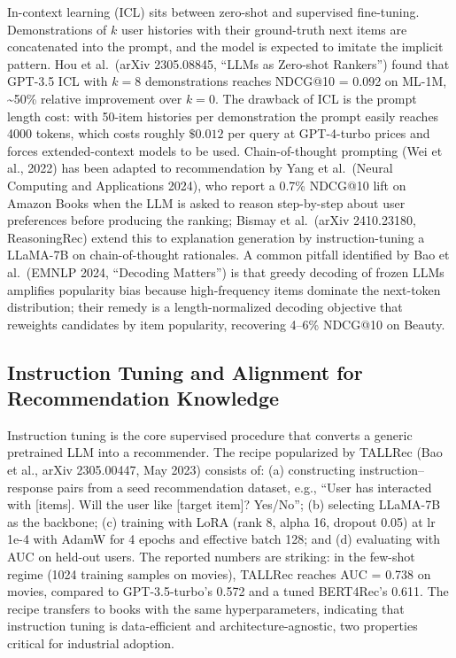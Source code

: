In-context learning (ICL) sits between zero-shot and supervised fine-tuning. Demonstrations of \(k\) user histories with their ground-truth next items are concatenated into the prompt, and the model is expected to imitate the implicit pattern. Hou et al.~(arXiv 2305.08845, ``LLMs as Zero-shot Rankers'') found that GPT-3.5 ICL with \(k=8\) demonstrations reaches NDCG@10 = 0.092 on ML-1M, \textasciitilde50\% relative improvement over \(k=0\). The drawback of ICL is the prompt length cost: with 50-item histories per demonstration the prompt easily reaches 4000 tokens, which costs roughly \(\$0.012\) per query at GPT-4-turbo prices and forces extended-context models to be used. Chain-of-thought prompting (Wei et al., 2022) has been adapted to recommendation by Yang et al.~(Neural Computing and Applications 2024), who report a 0.7\% NDCG@10 lift on Amazon Books when the LLM is asked to reason step-by-step about user preferences before producing the ranking; Bismay et al.~(arXiv 2410.23180, ReasoningRec) extend this to explanation generation by instruction-tuning a LLaMA-7B on chain-of-thought rationales. A common pitfall identified by Bao et al.~(EMNLP 2024, ``Decoding Matters'') is that greedy decoding of frozen LLMs amplifies popularity bias because high-frequency items dominate the next-token distribution; their remedy is a length-normalized decoding objective that reweights candidates by item popularity, recovering 4--6\% NDCG@10 on Beauty.

\subsection{Instruction Tuning and Alignment for Recommendation Knowledge}\label{instruction-tuning-and-alignment-for-recommendation-knowledge}

Instruction tuning is the core supervised procedure that converts a generic pretrained LLM into a recommender. The recipe popularized by TALLRec (Bao et al., arXiv 2305.00447, May 2023) consists of: (a) constructing instruction--response pairs from a seed recommendation dataset, e.g., ``User has interacted with {[}items{]}. Will the user like {[}target item{]}? Yes/No''; (b) selecting LLaMA-7B as the backbone; (c) training with LoRA (rank 8, alpha 16, dropout 0.05) at lr 1e-4 with AdamW for 4 epochs and effective batch 128; and (d) evaluating with AUC on held-out users. The reported numbers are striking: in the few-shot regime (1024 training samples on movies), TALLRec reaches AUC = 0.738 on movies, compared to GPT-3.5-turbo's 0.572 and a tuned BERT4Rec's 0.611. The recipe transfers to books with the same hyperparameters, indicating that instruction tuning is data-efficient and architecture-agnostic, two properties critical for industrial adoption.

